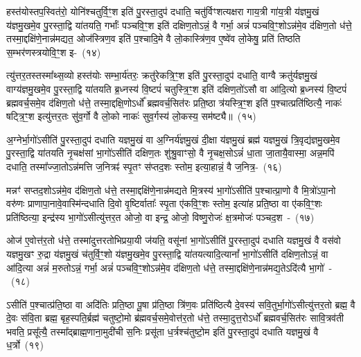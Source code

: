 हस्त॑योस्तप॒स्वित॑रो॒ योनि॑श्चतुर्वि॒ꣳ॒श इति॑ पु॒रस्ता॒दुप॑ दधाति॒ चतु॑र्विꣳशत्यक्षरा गाय॒त्री गा॑य॒त्री य॑ज्ञमु॒खं य॑ज्ञमु॒खमे॒व पु॒रस्ता॒द्वि या॑तयति॒ गर्भाः᳚ पञ्चवि॒ꣳ॒श इति॑ दक्षिण॒तो\-ऽन्नं॒ वै गर्भा॒ अन्नं॑ पञ्चवि॒ꣳ॒शो\-ऽन्न॑मे॒व द॑क्षिण॒तो ध॑त्ते॒ तस्मा॒द्दक्षि॑णे॒नान्न॑मद्यत॒ ओज॑स्त्रिण॒व इति॑ प॒श्चादि॒मे वै लो॒कास्त्रि॑ण॒व ए॒ष्वे॑व लो॒केषु॒ प्रति॑ तिष्ठति स॒म्भर॑णस्त्रयोवि॒ꣳ॒श इ-~(१४)\ip

त्यु॑त्तर॒तस्तस्मा᳚थ्स॒व्यो हस्त॑योः सम्भा॒र्य॑तरः॒ क्रतु॑रेकत्रि॒ꣳ॒श इति॑ पु॒रस्ता॒दुप॑ दधाति॒ वाग्वै क्रतु॑र्यज्ञमु॒खं वाग्य॑ज्ञमु॒खमे॒व पु॒रस्ता॒द्वि या॑तयति ब्र॒ध्नस्य॑ वि॒ष्टपं॑ चतुस्त्रि॒ꣳ॒श इति॑ दक्षिण॒तो॑\-ऽसौ वा आ॑दि॒त्यो ब्र॒ध्नस्य॑ वि॒ष्टपं॑ ब्रह्मवर्च॒समे॒व द॑क्षिण॒तो ध॑त्ते॒ तस्मा॒द्दक्षि॒णो\-ऽर्धो᳚ ब्रह्मवर्च॒सित॑रः प्रति॒ष्ठा त्र॑यस्त्रि॒ꣳ॒श इति॑ प॒श्चात्प्रति॑ष्ठित्यै॒ नाकः॑ षट्त्रि॒ꣳ॒श इत्यु॑त्तर॒तः सु॑व॒र्गो वै लो॒को नाकः॑ सुव॒र्गस्य॑ लो॒कस्य॒ सम॑ष्ट्यै॥~(१५)\ip

{\anuvakamend[{वै त्रि॒वृदिति॑ पु॒रस्ता᳚थ्स॒व्यस्त्र॑योवि॒ꣳ॒श इति॑ सुव॒र्गो वै पञ्च॑ च॥(३) आ॒शुर्व्यो॑म ध॒रुणो॑ भा॒न्तः प्रतू᳚र्तिरभिव॒र्तो वर्च॒स्तपो॒ योनि॒र्गर्भा॒ ओजः॑ स॒म्भर॑णः॒ क्रतु॑र्ब्र॒ध्नस्य॑ प्रति॒ष्ठा नाकः॒ षोड॑श॥}]}%

अ॒ग्नेर्भा॒गो॑\-ऽसीति॑ पु॒रस्ता॒दुप॑ दधाति यज्ञमु॒खं वा अ॒ग्निर्य॑ज्ञमु॒खं दी॒क्षा य॑ज्ञमु॒खं ब्रह्म॑ यज्ञमु॒खं त्रि॒वृद्य॑ज्ञमु॒खमे॒व पु॒रस्ता॒द्वि या॑तयति नृ॒चक्ष॑सां भा॒गो॑\-ऽसीति॑ दक्षिण॒तः शु॑श्रु॒वाꣳसो॒ वै नृ॒चक्ष॒सो\-ऽन्नं॑ धा॒ता जा॒तायै॒वास्मा॒ अन्न॒मपि॑ दधाति॒ तस्मा᳚ज्जा॒तो\-ऽन्न॑मत्ति ज॒नित्रꣴ॑ स्पृ॒तꣳ स॑प्तद॒शः स्तोम॒ इत्या॒हान्नं॒ वै ज॒नित्र॒-~(१६)\ip

मन्नꣳ॑ सप्तद॒शो\-ऽन्न॑मे॒व द॑क्षिण॒तो ध॑त्ते॒ तस्मा॒द्दक्षि॑णे॒नान्न॑मद्यते मि॒त्रस्य॑ भा॒गो॑\-ऽसीति॑ प॒श्चात्प्रा॒णो वै मि॒त्रो॑\-ऽपा॒नो वरु॑णः प्राणापा॒नावे॒वास्मि॑न्दधाति दि॒वो वृ॒ष्टिर्वाताः᳚ स्पृ॒ता ए॑कवि॒ꣳ॒शः स्तोम॒ इत्या॑ह प्रति॒ष्ठा वा ए॑कवि॒ꣳ॒शः प्रति॑ष्ठित्या॒ इन्द्र॑स्य भा॒गो॑\-ऽसीत्यु॑त्तर॒त ओजो॒ वा इन्द्र॒ ओजो॒ विष्णु॒रोजः॑ क्ष॒त्रमोजः॑ पञ्चद॒श~-~(१७)\ip

ओज॑ ए॒वोत्त॑र॒तो ध॑त्ते॒ तस्मा॑दुत्तरतोभिप्रया॒यी ज॑यति॒ वसू॑नां भा॒गो॑\-ऽसीति॑ पु॒रस्ता॒दुप॑ दधाति यज्ञमु॒खं वै वस॑वो यज्ञमु॒खꣳ रु॒द्रा य॑ज्ञमु॒खं च॑तुर्वि॒ꣳ॒शो य॑ज्ञमु॒खमे॒व पु॒रस्ता॒द्वि या॑तयत्यादि॒त्यानां᳚ भा॒गो॑\-ऽसीति॑ दक्षिण॒तो\-ऽन्नं॒ वा आ॑दि॒त्या अन्नं॑ म॒रुतो\-ऽन्नं॒ गर्भा॒ अन्नं॑ पञ्चवि॒ꣳ॒शो\-ऽन्न॑मे॒व द॑क्षिण॒तो ध॑त्ते॒ तस्मा॒द्दक्षि॑णे॒नान्न॑मद्य॒ते\-ऽदि॑त्यै भा॒गो॑~-~(१८)\ip

ऽसीति॑ प॒श्चात्प्र॑ति॒ष्ठा वा अदि॑तिः प्रति॒ष्ठा पू॒षा प्र॑ति॒ष्ठा त्रि॑ण॒वः प्रति॑ष्ठित्यै दे॒वस्य॑ सवि॒तुर्भा॒गो॑\-ऽसीत्यु॑त्तर॒तो ब्रह्म॒ वै दे॒वः स॑वि॒ता ब्रह्म॒ बृह॒स्पति॒र्ब्रह्म॑ चतुष्टो॒मो ब्र॑ह्मवर्च॒समे॒वोत्त॑र॒तो ध॑त्ते॒ तस्मा॒दुत्त॒रो\-ऽर्धो᳚ ब्रह्मवर्च॒सित॑रः सावि॒त्रव॑ती भवति॒ प्रसू᳚त्यै॒ तस्मा᳚द्\-ब्राह्म॒णाना॒मुदी॑ची स॒निः प्रसू॑ता ध॒र्त्रश्च॑तुष्टो॒म इति॑ पु॒रस्ता॒दुप॑ दधाति यज्ञमु॒खं वै ध॒र्त्रो~(१९)\ip

